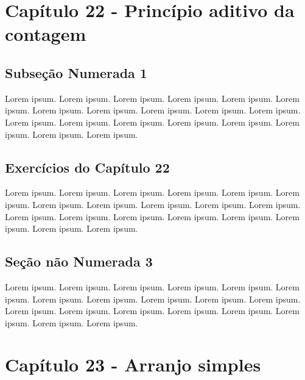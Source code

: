 \documentclass[
]{book}
\begin{document}
\hypertarget{capuxedtulo-22---princuxedpio-aditivo-da-contagem-1}{%
\section{Capítulo 22 - Princípio aditivo da contagem}\label{capuxedtulo-22---princuxedpio-aditivo-da-contagem-1}}

\hypertarget{subseuxe7uxe3o-numerada-1-3}{%
\subsection{Subseção Numerada 1}\label{subseuxe7uxe3o-numerada-1-3}}

Lorem ipsum. Lorem ipsum. Lorem ipsum. Lorem ipsum. Lorem ipsum. Lorem ipsum. Lorem ipsum. Lorem ipsum. Lorem ipsum. Lorem ipsum. Lorem ipsum. Lorem ipsum. Lorem ipsum. Lorem ipsum. Lorem ipsum. Lorem ipsum. Lorem ipsum. Lorem ipsum. Lorem ipsum.

\hypertarget{exercuxedcios-do-capuxedtulo-22-1}{%
\subsection{Exercícios do Capítulo 22}\label{exercuxedcios-do-capuxedtulo-22-1}}

Lorem ipsum. Lorem ipsum. Lorem ipsum. Lorem ipsum. Lorem ipsum. Lorem ipsum. Lorem ipsum. Lorem ipsum. Lorem ipsum. Lorem ipsum. Lorem ipsum. Lorem ipsum. Lorem ipsum. Lorem ipsum. Lorem ipsum. Lorem ipsum. Lorem ipsum. Lorem ipsum. Lorem ipsum.

\hypertarget{seuxe7uxe3o-nuxe3o-numerada-3-3}{%
\subsection*{Seção não Numerada 3}\label{seuxe7uxe3o-nuxe3o-numerada-3-3}}

Lorem ipsum. Lorem ipsum. Lorem ipsum. Lorem ipsum. Lorem ipsum. Lorem ipsum. Lorem ipsum. Lorem ipsum. Lorem ipsum. Lorem ipsum. Lorem ipsum. Lorem ipsum. Lorem ipsum. Lorem ipsum. Lorem ipsum. Lorem ipsum. Lorem ipsum. Lorem ipsum. Lorem ipsum.

\hypertarget{capuxedtulo-23---arranjo-simples-1}{%
\section{Capítulo 23 - Arranjo simples}\label{capuxedtulo-23---arranjo-simples-1}}
\end{document}
